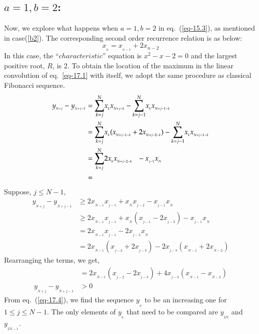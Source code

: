 \begin{multicols}{2}
\section{\underline{$a=1, b = 2$}:}\label{section-17}
Now, we explore what happens when $a=1, b=2$ in eq.~(\ref{eq-15.3}), as mentioned in case(\ref{b2}). The corresponding second order recurrence relation is as below:
\begin{equation}
x_{_n} =  x_{_{n-1}} + 2x_{{n-2}}\label{eq-17.1}
\end{equation}
In this case, the ``$characteristic$'' equation is $x^2 - x - 2 = 0$ and the largest positive root, $R$, is 2. To obtain the location of the maximum in the linear convolution of eq.~\ref{eq-17.1} with itself, we adopt the same procedure as classical Fibonacci sequence.
{\fontsize{9}{9}\selectfont\begin{align}
y_{_{N+j}} - y_{_{N+j-1}} &= \displaystyle{\sum_{k=j}^{N}}x_{_{k}}x_{_{N+j-k}} -  \displaystyle{\sum_{k=j-1}^{N}}x_{_k}x_{_{N+j-1-k}}\nonumber\\
&= \displaystyle{\sum_{k=j}^{N}}x_{_{k}}(x_{_{N+j-1-k}}+2x_{_{N+j-2-k}}) -  \displaystyle{\sum_{k=j-1}^{N}}x_{_k}x_{_{N+j-1-k}}\nonumber\\
&= \displaystyle{\sum_{k=j}^{N}}2x_{_{k}}x_{_{N+j-2-k}} \hspace{0.1in}- x_{_{j-1}}x_{_N}\label{eq-17.2}\\
&=\label{eq-17.3}\\
\end{align}}
Suppose, $j \leq N-1$,
\begin{align}
y_{_{N+j}} - y_{_{N+j-1}}&\geq 2x_{_{N-1}}x_{_{j-1}} + x_{_N}x_{_{j-2}} - x_{_{j-1}}x_{_N}\nonumber\\
&\geq 2x_{_{N-1}}x_{_{j-1}} + x_{_N}(x_{_{j-1}}-2x_{_{j-3}})- x_{_{j-1}}x_{_N}\nonumber\\
&= 2x_{_{N-1}}x_{_{j-1}} - 2x_{_{j-3}}x_{_N}\nonumber\\
&= 2x_{_{N-1}}(x_{_{j-2}}+2x_{_{j-3}}) - 2x_{_{j-3}}(x_{_{N-1}}+2x_{_{N-2}})\nonumber
\end{align}
Rearranging the terms, we get,
\begin{align}
&= 2x_{_{N-1}}(x_{_{j-2}} - 2x_{_{j-3}}) + 4x_{_{j-3}}(x_{_{N-1}} - x_{_{N-2}})\nonumber\\
y_{_{N+j}} - y_{_{N+j-1}}&> 0\label{eq-17.4}
\end{align}
From eq.~(\ref{eq-17.4}), we find the sequence $y_{_n}$ to be an increasing one for $1 \leq j \leq N-1$. The only elements of $y_{_n}$ that need to be compared are $y_{_{2N}}$ and $y_{_{2N-1}}$.


\end{multicols}
